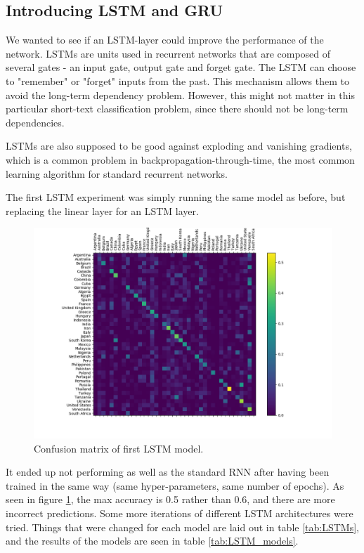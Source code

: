 \documentclass[runningheads]{llncs}
\begin{document}
\subsection{Introducing LSTM and GRU}

We wanted to see if an LSTM-layer could improve the performance of the network. LSTMs are units used in recurrent networks that are composed of several gates - an input gate, output gate and forget gate. The LSTM can choose to "remember" or "forget" inputs from the past. This mechanism allows them to avoid the long-term dependency problem. However, this might not matter in this particular short-text classification problem, since there should not be long-term dependencies.

LSTMs are also supposed to be good against exploding and vanishing gradients, which is a common problem in backpropagation-through-time, the most common learning algorithm for standard recurrent networks.

The first LSTM experiment was simply running the same model as before, but replacing the linear layer for an LSTM layer.
 
\begin{figure}[h!]
	\centering
        \includegraphics[width=.5\textwidth]{plots/conf_matrix_initial_LSTM.png}
	\caption{ Confusion matrix of first LSTM model.}
	\label{fig:conf_initial_lstm}
\end{figure}
 
It ended up not performing as well as the standard RNN after having been trained in the same way (same hyper-parameters, same number of epochs). As seen in figure \ref{fig:conf_initial_lstm}, the max accuracy is 0.5 rather than 0.6, and there are more incorrect predictions. Some more iterations of different LSTM architectures were tried. Things that were changed for each model are laid out in table \ref{tab:LSTMs}, and the results of the models are seen in table \ref{tab:LSTM_models}.
\end{document}
